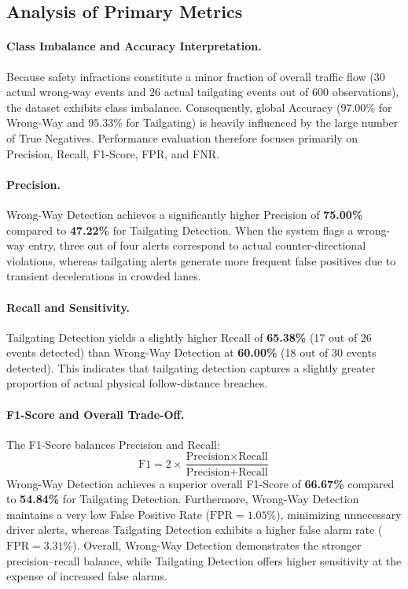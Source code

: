 \subsection{Analysis of Primary Metrics}

\paragraph{Class Imbalance and Accuracy Interpretation.}
Because safety infractions constitute a minor fraction of overall traffic flow ($30$ actual wrong-way events and $26$ actual tailgating events out of 600 observations), the dataset exhibits class imbalance. Consequently, global Accuracy ($97.00\%$ for Wrong-Way and $95.33\%$ for Tailgating) is heavily influenced by the large number of True Negatives. Performance evaluation therefore focuses primarily on Precision, Recall, F1-Score, FPR, and FNR.

\paragraph{Precision.}
Wrong-Way Detection achieves a significantly higher Precision of \textbf{75.00\%} compared to \textbf{47.22\%} for Tailgating Detection. When the system flags a wrong-way entry, three out of four alerts correspond to actual counter-directional violations, whereas tailgating alerts generate more frequent false positives due to transient decelerations in crowded lanes.

\paragraph{Recall and Sensitivity.}
Tailgating Detection yields a slightly higher Recall of \textbf{65.38\%} (17 out of 26 events detected) than Wrong-Way Detection at \textbf{60.00\%} (18 out of 30 events detected). This indicates that tailgating detection captures a slightly greater proportion of actual physical follow-distance breaches.

\paragraph{F1-Score and Overall Trade-Off.}
The F1-Score balances Precision and Recall:
\begin{equation}
    \text{F1} = 2 \times \frac{\text{Precision} \times \text{Recall}}{\text{Precision} + \text{Recall}}
\end{equation}
Wrong-Way Detection achieves a superior overall F1-Score of \textbf{66.67\%} compared to \textbf{54.84\%} for Tailgating Detection. Furthermore, Wrong-Way Detection maintains a very low False Positive Rate ($\text{FPR} = 1.05\%$), minimizing unnecessary driver alerts, whereas Tailgating Detection exhibits a higher false alarm rate ($\text{FPR} = 3.31\%$). Overall, Wrong-Way Detection demonstrates the stronger precision--recall balance, while Tailgating Detection offers higher sensitivity at the expense of increased false alarms.

